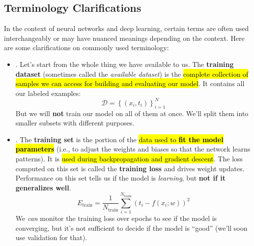 \subsection{Terminology Clarifications}

In the context of neural networks and deep learning, certain terms are often used interchangeably or may have nuanced meanings depending on the context. Here are some clarifications on commonly used terminology:
\begin{itemize}
    \item {}. Let's start from the whole thing we have available to us. The \textbf{training dataset} (sometimes called the \emph{available dataset}) is the \hl{complete collection of samples we can access for building and evaluating our model}. It contains all our labeled examples:
    \begin{equation*}
        \mathcal{D} = \left\{\left(x_i, t_i\right)\right\}_{i=1}^{N}
    \end{equation*}
    But we will \textbf{not} train our model on all of them at once. We'll split them into smaller subsets with different purposes.

    \item {}. The \textbf{training set} is the portion of the \hl{data used to \textbf{fit the model parameters}} (i.e., to adjust the weights and biases so that the network learns patterns). It is \hl{used during backpropagation and gradient descent}. The loss computed on this set is called the \textbf{training loss} and drives weight updates. Performance on this set tells us if the model is \emph{learning}, but \textbf{not if it generalizes well}.
    \begin{equation*}
        E_{\text{train}} = \dfrac{1}{N_{\text{train}}} \sum_{i=1}^{N_{\text{train}}} \left(t_{i} - f\left(x_i; w\right)\right)^{2}
    \end{equation*}
    We \emph{can} monitor the training loss over epochs to see if the model is converging, but it's not sufficient to decide if the model is ``good'' (we'll soon use validation for that).


\end{itemize}
